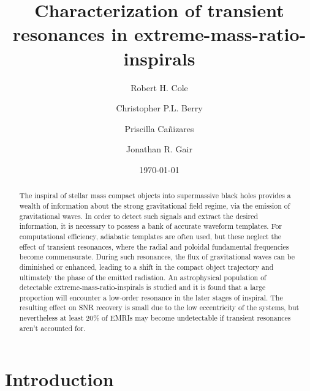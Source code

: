 \documentclass[aps,prd,amsfonts,amssymb,amsmath,nofootinbib,reprint,showpacs]{revtex4}
\begin{document}

\title{Characterization of transient resonances in extreme-mass-ratio-inspirals}

\author{Robert H. Cole}
\author{Christopher P.L. Berry}
\author{Priscilla Ca\~{n}izares}
\author{Jonathan R. Gair}

\date{\today}

\begin{abstract}
The inspiral of stellar mass compact objects into supermassive black holes provides a wealth of information about the strong gravitational field regime, via the emission of gravitational waves. In order to detect such signals and extract the desired information, it is necessary to possess a bank of accurate waveform templates. For computational efficiency, adiabatic templates are often used, but these neglect the effect of transient resonances, where the radial and poloidal fundamental frequencies become commensurate. During such resonances, the flux of gravitational waves can be diminished or enhanced, leading to a shift in the compact object trajectory and ultimately the phase of the emitted radiation. An astrophysical population of detectable extreme-mass-ratio-inspirals is studied and it is found that a large proportion will encounter a low-order resonance in the later stages of inspiral. The resulting effect on SNR recovery is small due to the low eccentricity of the systems, but nevertheless at least 20\% of EMRIs may become undetectable if transient resonances aren't accounted for.
\end{abstract}


\maketitle

\section{Introduction}
\end{document}
